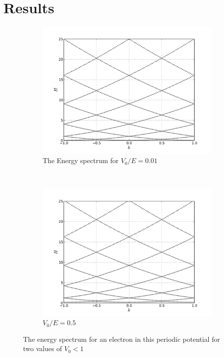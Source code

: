 \documentclass[11pt,a4paper]{article}
\begin{document}
\section*{Results}

\begin{figure}[h]
        \centering
        \begin{subfigure}[h!]{0.5\textwidth}
                \includegraphics[width=\textwidth]{ener_spectrum/spectr_v01d10.pdf}
                \caption{The Energy spectrum for $V_0/E = 0.01$}
                \label{fig:1a}
        \end{subfigure}%
        ~ %
        \begin{subfigure}[hb!]{0.5\textwidth}
                \includegraphics[width=\textwidth]{ener_spectrum/spectr_v01d2.pdf}
                \caption{$V_0/E = 0.5$}
                \label{fig:1b}
        \end{subfigure}
\caption{The energy spectrum for an electron in this periodic potential for two values of $V_0 < 1$}\label{fig:ener1}
\end{figure}
\end{document}
